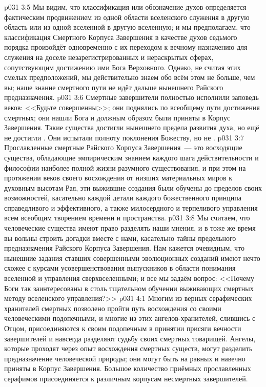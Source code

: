 \vs p031 3:5 Мы видим, что классификация или обозначение духов определяется фактическим продвижением из одной области вселенского служения в другую область или из одной вселенной в другую вселенную; и мы предполагаем, что классификация Смертного Корпуса Завершения в качестве духов седьмого порядка произойдёт одновременно с их переходом к вечному назначению для служения на доселе незарегистрированных и нераскрытых сферах, сопутствующим достижению ими Бога Верховного. Однако, не считая этих смелых предположений, мы действительно знаем обо всём этом не больше, чем вы; наше знание смертного пути не идёт дальше нынешнего Райского предназначения.
\vs p031 3:6 Смертные завершители полностью исполнили заповедь веков: <<Будьте совершенны>>; они поднялись по всеобщему пути достижения смертных; они нашли Бога и должным образом были приняты в Корпус Завершения. Такие существа достигли нынешнего предела развития духа, но ещё не достигли . Они испытали полноту поклонения Божеству, но не .
\vs p031 3:7 Прославленные смертные Райского Корпуса Завершения~--- это восходящие существа, обладающие эмпирическим знанием каждого шага действительности и философии наиболее полной жизни разумного существования, и при этом на протяжении веков своего восхождения от низших материальных миров к духовным высотам Рая, эти выжившие создания были обучены до пределов своих возможностей, касательно каждой детали каждого божественного принципа справедливого и эффективного, а также милосердного и терпеливого управления всем всеобщим творением времени и пространства.
\vs p031 3:8 \pc Мы считаем, что человеческие существа имеют право разделять наши мнения, и в тоже же время вы вольны строить догадки вместе с нами, касательно тайны предельного предназначения Райского Корпуса Завершения. Нам кажется очевидным, что нынешние задания ставших совершенными эволюционных созданий имеют нечто схожее с курсами усовершенствования выпускников в области понимания вселенной и управления сверхвселенными; и все мы задаём вопрос: <<Почему Боги так заинтересованы в столь тщательном обучении выживающих смертных методу вселенского управления?>>
\vs p031 4:1 Многим из верных серафических хранителей смертных позволено пройти путь восхождения со своими человеческими подопечными, и многие из этих ангелов\hyp{}хранителей, слившись с Отцом, присоединяются к своим подопечным в принятии присяги вечности завершителей и навсегда разделяют судьбу своих смертных товарищей. Ангелы, которые проходят через опыт восхождения смертных существ, могут разделить предназначение человеческой природы; они могут быть на равных и навечно приняты в Корпус Завершения. Большое количество приёмных прославленных серафимов присоединяется к различным корпусам несмертных завершителей.
